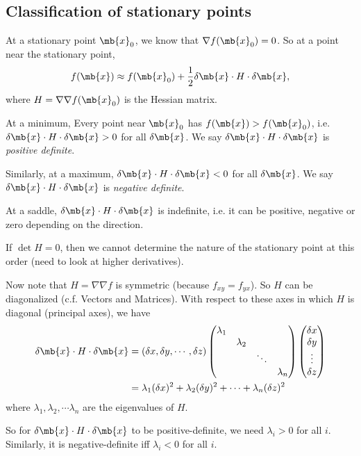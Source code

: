 \documentclass[a4paper]{article}
\begin{document}
\subsection{Classification of stationary points}
At a stationary point $\mb{x}_0$, we know that $\nabla f(\mb{x}_0) = 0$. So at a point near the stationary point,
\[
f(\mb{x})\approx f(\mb{x}_0) + \frac{1}{2}\delta\mb{x}\cdot H\cdot \delta\mb{x},
\]
where $H = \nabla\nabla f(\mb{x}_0)$  is the Hessian matrix.

At a minimum, Every point near $\mb{x}_0$ has $f(\mb{x}) > f(\mb{x}_0)$, i.e. $\delta \mb{x}\cdot H\cdot \delta \mb{x} > 0$ for all $\delta \mb{x}$. We say $\delta \mb{x}\cdot H\cdot\delta \mb{x}$ is \emph{positive definite}.

Similarly, at a maximum, $\delta \mb{x}\cdot H\cdot \delta\mb{x} < 0$ for all $\delta \mb{x}$. We say $\delta \mb{x}\cdot H\cdot \delta \mb{x}$ is \emph{negative definite}.

At a saddle, $\delta \mb{x} \cdot H\cdot \delta\mb{x}$ is indefinite, i.e. it can be positive, negative or zero depending on the direction.

\note If $\det H = 0$, then we cannot determine the nature of the stationary point at this order (need to look at higher derivatives).

Now note that $H = \nabla\nabla f$ is symmetric (because $f_{xy} = f_{yx}$). So $H$ can be diagonalized (c.f. Vectors and Matrices). With respect to these axes in which $H$ is diagonal (principal axes), we have
\begin{align*}
  \delta\mb{x}\cdot H\cdot \delta\mb{x} &= (\delta x, \delta y, \cdots, \delta z)
  \begin{pmatrix}
    \lambda_1\\
    &\lambda_2\\
    &&\ddots\\
    &&&\lambda_n
  \end{pmatrix}
  \begin{pmatrix}
    \delta x\\\delta y\\\vdots\\\delta z
  \end{pmatrix}\\
  &= \lambda_1(\delta x)^2 + \lambda_2 (\delta y)^2 + \cdots + \lambda_n(\delta z)^2
\end{align*}
where $\lambda_1, \lambda_2, \cdots \lambda_n$ are the eigenvalues of $H$. 

So for $\delta \mb{x}\cdot H\cdot \delta \mb{x}$ to be positive-definite, we need $\lambda_i > 0$ for all $i$. Similarly, it is negative-definite iff $\lambda_i < 0$ for all $i$.
\end{document}
